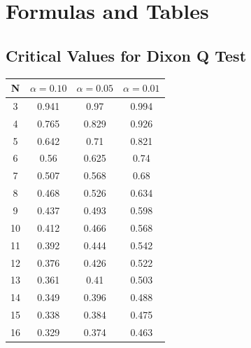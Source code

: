 \documentclass[a4paper,12pt]{article}
\begin{document}
\section*{Formulas and Tables}

	\subsection*{Critical Values for Dixon Q Test}
	{
		\Large
		\begin{center}
			\begin{tabular}{|c|c|c|c|}
				\hline  N  & $\alpha=0.10$  & $\alpha=0.05$  & $\alpha=0.01$  \\ \hline
				3  & 0.941 & 0.97  & 0.994 \\ \hline
				4  & 0.765 & 0.829 & 0.926 \\ \hline
				5  & 0.642 & 0.71  & 0.821 \\ \hline
				6  & 0.56  & 0.625 & 0.74  \\ \hline
				7  & 0.507 & 0.568 & 0.68  \\ \hline
				8  & 0.468 & 0.526 & 0.634 \\ \hline
				9  & 0.437 & 0.493 & 0.598 \\ \hline
				10 & 0.412 & 0.466 & 0.568 \\ \hline
				11 & 0.392 & 0.444 & 0.542 \\ \hline
				12 & 0.376 & 0.426 & 0.522 \\ \hline
				13 & 0.361 & 0.41  & 0.503 \\ \hline
				14 & 0.349 & 0.396 & 0.488 \\ \hline
				15 & 0.338 & 0.384 & 0.475 \\ \hline
				16 & 0.329 & 0.374 & 0.463 \\ \hline
			\end{tabular} 
		\end{center}
	}
\end{document}
